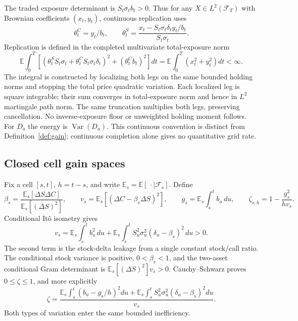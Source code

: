 \documentclass[11pt,a4paper]{amsart}
\theoremstyle{plain}
\theoremstyle{definition}
\theoremstyle{remark}
\DeclareMathOperator{\Var}{Var}
\newcommand{\EE}{\mathbb{E}}
\newcommand{\F}{\mathcal F}
\newcommand{\Es}{\EE_s}
\begin{document}
The traded exposure determinant is $S_t\sigma_t b_t>0$. Thus for any $X\in L^2(\F_T)$ with Brownian coefficients $(x_t,y_t)$, continuous replication uses
\begin{equation}\label{eq:continuous-holdings}
 \theta_t^C=y_t/b_t,\qquad
 \theta_t^S=\frac{x_t-S_t\sigma_t\delta_t y_t/b_t}{S_t\sigma_t}.
\end{equation}
Replication is defined in the completed multivariate total-exposure norm
\begin{equation}\label{eq:continuous-energy}
 \EE\int_0^T\left[(\theta_t^S S_t\sigma_t+
             \theta_t^C S_t\sigma_t\delta_t)^2+(\theta_t^C b_t)^2\right]dt
 =\EE\int_0^T(x_t^2+y_t^2)dt<\infty.
\end{equation}
The integral is constructed by localizing both legs on the same bounded holding norms and stopping the total price quadratic variation. Each localized leg is square integrable; their sum converges in total-exposure norm and hence in $L^2$ martingale path norm. The same truncation multiplies both legs, preserving cancellation. No inverse-exposure floor or unweighted holding moment follows. For $D_a$ the energy is $\Var(D_a)$. This continuous convention is distinct from Definition~\ref{def:gain}; continuous completion alone gives no quantitative grid rate.

\subsection{Closed cell gain spaces}
Fix a cell $[s,t]$, $h=t-s$, and write $\Es=\EE[\,\cdot\mid\F_s]$. Define
\begin{equation}\label{eq:cell-definitions}
 \beta_s=\frac{\Es[\Delta S\Delta C]}{\Es[(\Delta S)^2]},\qquad
 v_s=\Es[(\Delta C-\beta_s\Delta S)^2],\qquad
 g_s=\Es\int_s^t b_u\,du,
 \qquad \zeta_{s,h}=1-\frac{g_s^2}{h v_s}.
\end{equation}
Conditional It\^o isometry gives
\begin{equation}\label{eq:variance-decomposition}
 v_s=\Es\int_s^t b_u^2\,du+
       \Es\int_s^tS_u^2\sigma_u^2(\delta_u-\beta_s)^2\,du>0.
\end{equation}
The second term is the stock-delta leakage from a single constant stock/call ratio. The conditional stock variance is positive, $0<\beta_s<1$, and the two-asset conditional Gram determinant is $\Es[(\Delta S)^2]v_s>0$. Cauchy--Schwarz proves $0\le\zeta\le1$, and more explicitly
\[
 \zeta=\frac{\Es\int_s^t(b_u-g_s/h)^2du+
                  \Es\int_s^tS_u^2\sigma_u^2(\delta_u-\beta_s)^2du}{v_s}.
\]
Both types of variation enter the same bounded inefficiency.
\end{document}
